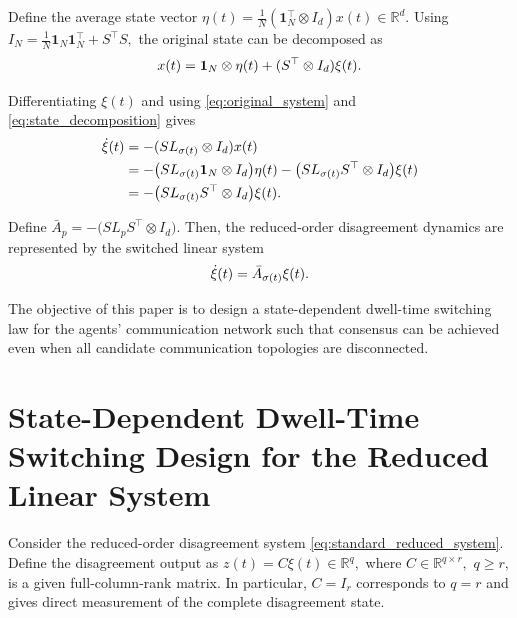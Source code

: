\documentclass[conference]{IEEEtran}
\begin{document}
	Define the average state vector
	$
	\eta(t)
	=
	\frac{1}{N}
	(\mathbf 1_N^\top\otimes I_d)x(t)
	\in\mathbb R^d.
	\label{eq:eta_definition}
	$
	Using
	$
	I_N
	=
	\frac{1}{N}\mathbf 1_N\mathbf 1_N^\top+S^\top S,
	$
	the original state can be decomposed as
	\vspace{-0.2\baselineskip}
	\begin{equation}		
		x(t)
		=
		\mathbf 1_N\otimes\eta(t)
		+
		(S^\top\otimes I_d)\xi(t).
		\label{eq:state_decomposition}
		\vspace{-0.2\baselineskip}
	\end{equation}
	
	Differentiating $\xi(t)$ and using
	\eqref{eq:original_system} and \eqref{eq:state_decomposition} gives
	\vspace{-0.2\baselineskip}
	\begin{align}		
		\dot{\xi}(t)
		&=
		-(SL_{\sigma(t)}\otimes I_d)x(t)
		\nonumber\\
		&=
		-\bigl(SL_{\sigma(t)}\mathbf 1_N\otimes I_d\bigr)\eta(t)
		-\bigl(SL_{\sigma(t)}S^\top\otimes I_d\bigr)\xi(t)
		\nonumber\\
		&=
		-\bigl(SL_{\sigma(t)}S^\top\otimes I_d\bigr)\xi(t).		
		\label{eq:xi_intermediate}
		\vspace{-0.2\baselineskip}
	\end{align}
	
	Define
	$
	\bar A_p
	=
	-\bigl(SL_pS^\top\otimes I_d\bigr).
	$
	Then, the reduced-order disagreement dynamics are represented by
	the switched linear system
	\vspace{-0.2\baselineskip}
	\begin{equation}
		\dot{\xi}(t)
		=
		\bar A_{\sigma(t)}\xi(t).
		\label{eq:standard_reduced_system}
		\vspace{-0.2\baselineskip}
	\end{equation}

	The objective of this paper is to design a state-dependent dwell-time switching law for the agents' communication network such that consensus can be achieved even when all candidate communication topologies are disconnected.
	\section{State-Dependent Dwell-Time Switching Design for the
		Reduced Linear System}
	\label{sec:switching_design}
	
	Consider the reduced-order disagreement system
	\eqref{eq:standard_reduced_system}.
	Define the disagreement output as
	$
	z(t)=C\xi(t)\in\mathbb R^q,
	$
	where $C\in\mathbb R^{q\times r},
	$
	$
	q\geq r,$ is a given full-column-rank matrix. In particular, $C=I_r$
	corresponds to $q=r$ and gives direct measurement of the
	complete disagreement state.
	
\end{document}
